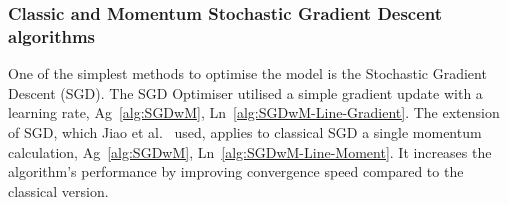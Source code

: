 %
\subsubsection{Classic and Momentum Stochastic Gradient Descent algorithms}
One of the simplest methods to optimise the model is the Stochastic Gradient Descent (SGD). %
The SGD Optimiser utilised a simple gradient update with a learning rate, Ag~\ref{alg:SGDwM}, Ln~\ref{alg:SGDwM-Line-Gradient}.
The extension of SGD, which Jiao et al.~\cite{jiao_gru-rnn_2020} used, applies to classical SGD a single momentum calculation, Ag~\ref{alg:SGDwM}, Ln~\ref{alg:SGDwM-Line-Moment}.
It increases the algorithm's performance by improving convergence speed compared to the classical version.

